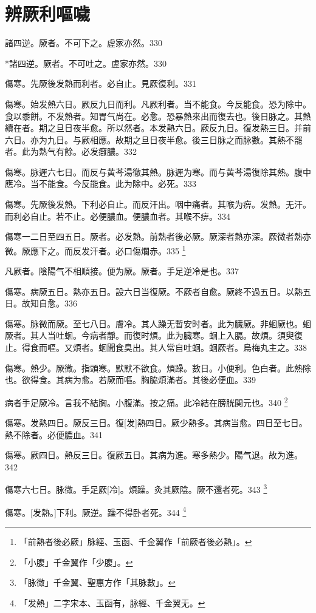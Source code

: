 \documentclass[12pt,twoside,UTF8,b5paper]{ctexbook}
\begin{document}
\chapter{辨厥利嘔噦}

諸四逆。厥者。不可下之。虗家亦然。330

*諸四逆。厥者。不可吐之。虗家亦然。330

傷寒。先厥後发熱而利者。必自止。見厥復利。331

傷寒。始发熱六日。厥反九日而利。凡厥利者。当不能食。今反能食。恐为除中。食以黍餅。不发熱者。知胃气尚在。必愈。恐暴熱來出而復去也。後日脉之。其熱續在者。期之旦日夜半愈。所以然者。本发熱六日。厥反九日。復发熱三日。并前六日。亦为九日。与厥相應。故期之旦日夜半愈。後三日脉之而脉數。其熱不罷者。此为熱气有餘。必发癰膿。332

傷寒。脉遲六七日。而反与黄芩湯徹其熱。脉遲为寒。而与黄芩湯復除其熱。腹中應冷。当不能食。今反能食。此为除中。必死。333

傷寒。先厥後发熱。下利必自止。而反汗出。咽中痛者。其喉为痹。发熱。无汗。而利必自止。若不止。必便膿血。便膿血者。其喉不痹。334

傷寒一二日至四五日。厥者。必发熱。前熱者後必厥。厥深者熱亦深。厥微者熱亦微。厥應下之。而反发汗者。必口傷爛赤。335
	\footnote{「前熱者後必厥」脉經、玉函、千金翼作「前厥者後必熱」。}

凡厥者。陰陽气不相順接。便为厥。厥者。手足逆冷是也。337

傷寒。病厥五日。熱亦五日。設六日当復厥。不厥者自愈。厥終不過五日。以熱五日。故知自愈。336

傷寒。脉微而厥。至七八日。膚冷。其人躁无暫安时者。此为臓厥。非蛔厥也。蛔厥者。其人当吐蛔。今病者靜。而復时煩。此为臓寒。蛔上入膈。故煩。須臾復止。得食而嘔。又煩者。蛔聞食臭出。其人常自吐蛔。蛔厥者。烏梅丸主之。338

傷寒。熱少。厥微。指頭寒。默默不欲食。煩躁。數日。小便利。色白者。此熱除也。欲得食。其病为愈。若厥而嘔。胸脇煩滿者。其後必便血。339

病者手足厥冷。言我不結胸。小腹滿。按之痛。此冷結在膀胱関元也。340
	\footnote{「小腹」千金翼作「少腹」。}

傷寒。发熱四日。厥反三日。復[发]熱四日。厥少熱多。其病当愈。四日至七日。熱不除者。必便膿血。341

傷寒。厥四日。熱反三日。復厥五日。其病为進。寒多熱少。陽气退。故为進。342

傷寒六七日。脉微。手足厥[冷]。煩躁。灸其厥陰。厥不還者死。343
	\footnote{「脉微」千金翼、聖惠方作「其脉數」。}

傷寒。[发熱。]下利。厥逆。躁不得卧者死。344
	\footnote{「发熱」二字宋本、玉函有，脉經、千金翼无。}
\end{document}
